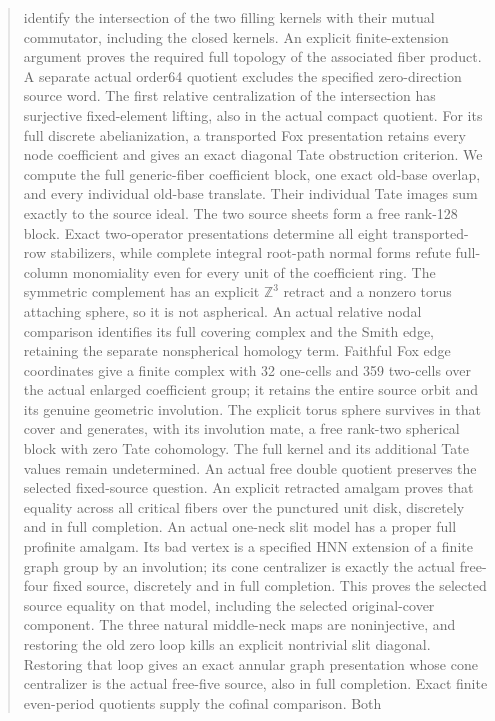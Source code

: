 \documentclass[11pt,a4paper]{article}
\begin{document}
\begin{abstract}
identify the intersection of the two filling kernels with their mutual
commutator, including the closed kernels. An explicit finite-extension
argument proves the required full topology of the associated fiber
product. A separate actual order64 quotient excludes the specified
zero-direction source word. The first relative centralization of the
intersection has surjective fixed-element lifting, also in the actual
compact quotient. For its full discrete abelianization, a transported
Fox presentation retains every node coefficient and gives an exact
diagonal Tate obstruction criterion. We compute the full generic-fiber
coefficient block, one exact old-base overlap, and every individual
old-base translate. Their individual Tate images sum exactly to the
source ideal. The two source sheets form a free rank-128 block.
Exact two-operator presentations determine all eight transported-row
stabilizers, while complete integral root-path normal forms refute
full-column monomiality even for every unit of the coefficient ring.
The symmetric complement has an explicit $\mathbb Z^3$ retract and a
nonzero torus attaching sphere, so it is not aspherical. An actual
relative nodal comparison identifies its full covering complex and the
Smith edge, retaining the separate nonspherical homology term. Faithful
Fox edge coordinates give a finite complex with 32 one-cells and 359
two-cells over the actual enlarged coefficient group; it retains the
entire source orbit and its genuine geometric involution. The explicit
torus sphere survives in that cover and generates, with its involution
mate, a free rank-two spherical block with zero Tate cohomology. The
full kernel and its additional Tate values remain undetermined. An actual
free double quotient preserves the selected fixed-source question.
An explicit retracted amalgam proves that equality across all critical
fibers over the punctured unit disk, discretely and in full completion.
An actual one-neck slit model has a proper full profinite amalgam.
Its bad vertex is a specified HNN extension of a finite graph group by
an involution; its cone centralizer is exactly the actual free-four
fixed source, discretely and in full completion. This proves the selected
source equality on that model, including the selected original-cover
component. The three natural middle-neck maps are noninjective, and
restoring the old zero loop kills an explicit nontrivial slit diagonal.
Restoring that loop gives an exact annular graph presentation whose
cone centralizer is the actual free-five source, also in full completion.
Exact finite even-period quotients supply the cofinal comparison. Both

\end{abstract}
\end{document}
